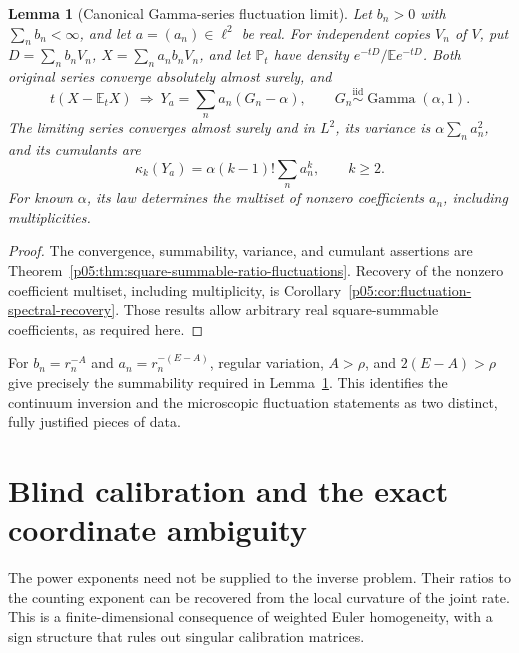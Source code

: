 \documentclass[11pt,letterpaper]{article}
\newtheorem{lemma}[theorem]{Lemma}
\theoremstyle{definition}
\theoremstyle{remark}
\newcommand{\1}{\mathbf 1}
\begin{document}
\begin{lemma}[Canonical Gamma-series fluctuation limit]
\label{p06:lem:scalar-gamma-foundation}
Let $b_n>0$ with $\sum_nb_n<\infty$, and let $a=(a_n)\in\ell^2$
be real.  For independent copies $V_n$ of $V$, put
$D=\sum_nb_nV_n$, $X=\sum_na_nb_nV_n$, and let
$\mathbb P_t$ have density $e^{-tD}/\mathbb E e^{-tD}$.
Both original series converge absolutely almost surely, and
\begin{equation}\label{p06:eq:scalar-gamma-foundation-limit}
 t(X-\mathbb E_tX)\ \Longrightarrow\
 Y_a=\sum_na_n(G_n-\alpha),\qquad
 G_n\overset{\mathrm{iid}}{\sim}\operatorname{Gamma}(\alpha,1).
\end{equation}
The limiting series converges almost surely and in $L^2$,
its variance is $\alpha\sum_na_n^2$, and its cumulants are
\begin{equation}\label{p06:eq:scalar-gamma-foundation-cumulants}
 \kappa_k(Y_a)=\alpha(k-1)!\sum_na_n^k,
 \qquad k\ge2.
\end{equation}
For known $\alpha$, its law determines the multiset of nonzero
coefficients $a_n$, including multiplicities.
\end{lemma}

\begin{proof}
The convergence, summability, variance, and cumulant assertions are
Theorem~\ref{p05:thm:square-summable-ratio-fluctuations}.
Recovery of the nonzero coefficient multiset, including multiplicity,
is Corollary~\ref{p05:cor:fluctuation-spectral-recovery}. Those results
allow arbitrary real square-summable coefficients, as required here.
\end{proof}

For $b_n=r_n^{-A}$ and $a_n=r_n^{-(E-A)}$, regular variation,
$A>\rho$, and $2(E-A)>\rho$ give precisely the summability required
in Lemma~\ref{p06:lem:scalar-gamma-foundation}.  This identifies the
continuum inversion and the microscopic fluctuation statements as
two distinct, fully justified pieces of data.

\section{Blind calibration and the exact coordinate ambiguity}
\label{p06:sec:blind-exponents}

The power exponents need not be supplied to the inverse problem.
Their ratios to the counting exponent can be recovered from the local
curvature of the joint rate.  This is a finite-dimensional consequence
of weighted Euler homogeneity, with a sign structure that rules out
singular calibration matrices.
\end{document}
